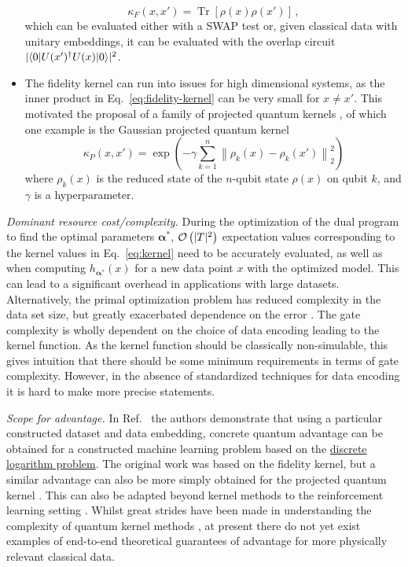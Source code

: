 \begin{refsection}
\begin{itemize}
\begin{equation}
        \kappa_F(x,x') = \operatorname{Tr}[\rho(x)\rho(x')]\,,
    \end{equation}
    which can be evaluated either with a SWAP test or, given classical data with unitary embeddings, it can be evaluated with the overlap circuit $|\langle0\rvert U(x')^{\dag}U(x)\lvert0\rangle|^2$.
    \item The fidelity kernel can run into issues for high dimensional systems, as the inner product in Eq.~\eqref{eq:fidelity-kernel} can be very small for $x\neq x'$. This motivated the proposal of a family of projected quantum kernels \cite{huang2021power}, of which one example is the Gaussian projected quantum kernel 
    \begin{equation}
        \kappa_P(x,x') =\exp \left(-\gamma \sum_{k=1}^n\left\|\rho_k(x)-\rho_k\left(x'\right)\right\|_2^2\right)
    \end{equation}
    where $\rho_k(x)$ is the reduced state of the $n$-qubit state $\rho(x)$ on qubit $k$, and $\gamma$ is a hyperparameter.
\end{itemize}

\textit{Dominant resource cost/complexity.} During the optimization of the dual program to find the optimal parameters $\boldsymbol{\alpha}^*$, $\mathcal{O}\left( |T|^2 \right)$ expectation values corresponding to the kernel values in Eq.~\eqref{eq:kernel} need to be accurately evaluated, as well as when computing $h_{\boldsymbol{\alpha}^*}(x)$ for a new data point $x$ with the optimized model. This can lead to a significant overhead in applications with large datasets. Alternatively, the primal optimization problem has reduced complexity in the data set size, but greatly exacerbated dependence on the error \cite{gentinetta2022complexityQSVM}. The gate complexity is wholly dependent on the choice of data encoding leading to the kernel function. As the kernel function should be classically non-simulable, this gives intuition that there should be some minimum requirements in terms of gate complexity. However, in the absence of standardized techniques for data encoding it is hard to make more precise statements. 

\textit{Scope for advantage.} In Ref.~\cite{liu2021rigorous} the authors demonstrate that using a particular constructed dataset and data embedding, concrete quantum advantage can be obtained for a constructed machine learning problem based on the \hyperref[appl:BreakingCrypto]{discrete logarithm problem}. The original work was based on the fidelity kernel, but a similar advantage can also be more simply obtained for the projected quantum kernel \cite{huang2021power}.
This can also be adapted beyond kernel methods to the reinforcement learning setting \cite{jerbi2021parametrized}. Whilst great strides have been made in understanding the complexity of quantum kernel methods \cite{banchi2021generalization, huang2021power}, at present there do not yet exist examples of end-to-end theoretical guarantees of advantage for more physically relevant classical data.





\end{refsection}
